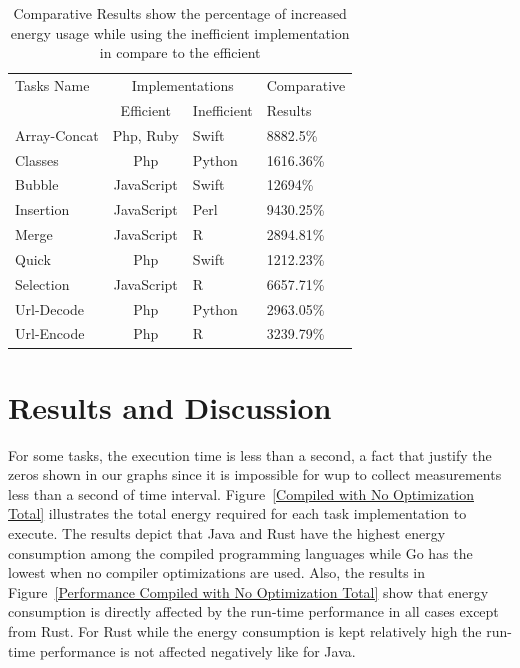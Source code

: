 \begin{table}
	\begin{threeparttable}
		\caption{Comparative Results show the percentage of increased energy usage while using the inefficient implementation in compare to the efficient}
		\label{Interpreted Energy Results}
		\begin{tabular}{lcll}
			\toprule
			Tasks Name	& \multicolumn{2}{c}{Implementations} & Comparative\\
						& Efficient	& Inefficient	& Results\\
			\midrule
			Array-Concat& Php, Ruby	& Swift			& 8882.5\% \\
			Classes		& Php		& Python		& 1616.36\% \\
			Bubble		& JavaScript& Swift			& 12694\% \\
			Insertion	& JavaScript& Perl			& 9430.25\% \\
			Merge		& JavaScript& R 			& 2894.81\% \\
			Quick 		& Php		& Swift			& 1212.23\% \\
			Selection	& JavaScript& R				& 6657.71\% \\
			Url-Decode	& Php		& Python		& 2963.05\% \\
			Url-Encode	& Php		& R				& 3239.79\% \\
			\bottomrule
		\end{tabular}
	\end{threeparttable}
\end{table}


\section{Results and Discussion} \label{results_and_discussion}
For some tasks, the execution time is less than a second, a fact
that justify the zeros shown in our graphs since it is impossible 
for {\sc wup} to collect measurements less than a second of time 
interval.
Figure~\ref{Compiled with No Optimization Total} illustrates 
the total energy required for each task implementation to execute.
The results depict that Java and Rust have the highest 
energy consumption among the compiled programming languages while 
Go has the lowest when no compiler optimizations are used.  
Also, the results in Figure~\ref{Performance Compiled with No Optimization Total} 
show that energy consumption is directly affected by the run-time 
performance in all cases except from Rust. 
For Rust while the energy consumption is kept relatively high 
the run-time performance is not affected negatively like for 
Java.


